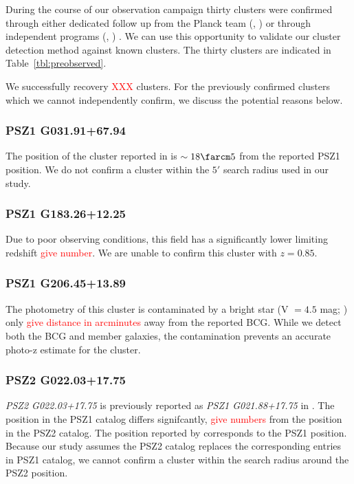 \documentclass[apj, revtex4]{emulateapj}
\newcommand{\editorial}[1]{\textcolor{red}{#1}}
\begin{document}
During the course of our observation campaign thirty clusters were confirmed through either dedicated follow up from the Planck team (\eg, \citealt{PlanckCollaboration2015, PlanckCollaboration2016a}) or through independent programs (\eg, \citealt{Liu2015a, VanderBurg2016, Burenin2017, Burenin2018, Amodeo2018, Barrena2018, Streblyanska2018}) . We can use this opportunity to validate our cluster detection method against known clusters. The thirty clusters are indicated in Table~\ref{tbl:preobserved}.

We successfully recovery \editorial{XXX} clusters. For the previously confirmed clusters which we cannot independently confirm, we discuss the potential reasons below.

\subsubsection{PSZ1 G031.91+67.94}

The position of the cluster reported in \cite{PlanckCollaboration2016a} is $\sim18\farcm5$ from the reported PSZ1 position. We do not confirm a cluster within the $5'$ search radius used in our study.

\subsubsection{PSZ1 G183.26+12.25}

Due to poor observing conditions, this field has a significantly lower limiting redshift \editorial{give number}. We are unable to confirm this cluster with $z=0.85.$ 

\subsubsection{PSZ1 G206.45+13.89}

The photometry of this cluster is contaminated by a bright star (V $= 4.5$ mag; \citealt{Hog2000}) only \editorial{give distance in arcminutes} away from the reported BCG. While we detect both the BCG and member galaxies, the contamination prevents an accurate photo-z estimate for the cluster.

\subsubsection{PSZ2 G022.03+17.75}

\textit{PSZ2 G022.03+17.75} is previously reported as \textit{PSZ1 G021.88+17.75} in \cite{PlanckCollaboration2014}. The position in the PSZ1 catalog differs signifcantly, \editorial{give numbers} from the position in the PSZ2 catalog. The position reported by \cite{Barrena2018} corresponds to the PSZ1 position. Because our study assumes the PSZ2 catalog replaces the corresponding entries in PSZ1 catalog, we cannot confirm a cluster within the search radius around the PSZ2 position.
\end{document}
